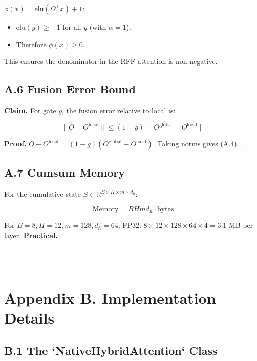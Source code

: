 $\phi(x) = \mathrm{elu}(\Omega^\top x) + 1$:

\begin{itemize}
\item $\mathrm{elu}(y) \geq -1$ for all $y$ (with $\alpha = 1$).
\item Therefore $\phi(x) \geq 0$.

\end{itemize}
This ensures the denominator in the RFF attention is non-negative.

\subsection{A.6 Fusion Error Bound}

\textbf{Claim.} For gate $g$, the fusion error relative to local is:

\[
\|O - O^\text{local}\| \leq (1 - g) \cdot \|O^\text{global} - O^\text{local}\|
\tag{A.4}
\]

\textbf{Proof.} $O - O^\text{local} = (1 - g)(O^\text{global} - O^\text{local})$. 
Taking norms gives (A.4). $\square$

\subsection{A.7 Cumsum Memory}

For the cumulative state $S \in \mathbb{R}^{B \times H \times m \times d_h}$:

\[
\text{Memory} = B H m d_h \cdot \text{bytes}
\tag{A.5}
\]

For $B=8, H=12, m=128, d_h=64$, FP32: $8 \times 12 \times 128 \times 64 \times 4 = 3.1$ MB per layer. \textbf{Practical.}
\begin{lstlisting}

---
\end{lstlisting}


\section{Appendix B. Implementation Details}

\subsection{B.1 The `NativeHybridAttention` Class}

